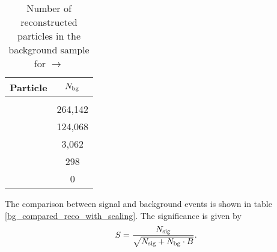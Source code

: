 \begin{table}
	\centering
	\caption{Number of reconstructed particles in the background sample for \newline \pbarp $\rightarrow$ \excitedcascade \anticascade }
	\label{tab:bg_reco_without_scaling}
	\begin{tabular}{lc}
		\hline
		Particle & $N_{\textnormal{bg}}$ \\
		\hline
		\hline
		&\\
		\lam & 264,142\\
		\alam & 124,068\\
		\anticascade & 3,062\\
		\excitedcascade & 298\\
		\excitedcascade \anticascade & 0\\
		\hline
		 
		  
	\end{tabular}
\end{table}
The comparison between signal and background events is shown in table \ref{bg_compared_reco_with_scaling}.
The significance is given by
\begin{equation}
	S = \frac{N_{\textnormal{sig}}}{\sqrt{N_{\textnormal{sig}}+N_{\textnormal{bg}}\cdot B}}.
	\label{eq:significance}
\end{equation}

